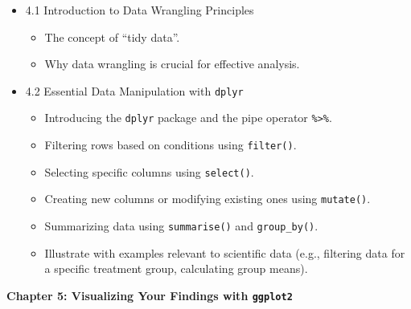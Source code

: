 \documentclass[
  letterpaper,
  DIV=11,
  numbers=noendperiod]{scrreprt}
\providecommand{\tightlist}{%
  \setlength{\itemsep}{0pt}\setlength{\parskip}{0pt}}\usepackage{longtable,booktabs,array}
\begin{document}
\begin{itemize}
\tightlist
\item
  4.1 Introduction to Data Wrangling Principles

  \begin{itemize}
  \tightlist
  \item
    The concept of ``tidy data''.
  \item
    Why data wrangling is crucial for effective analysis.
  \end{itemize}
\item
  4.2 Essential Data Manipulation with \texttt{dplyr}

  \begin{itemize}
  \tightlist
  \item
    Introducing the \texttt{dplyr} package and the pipe operator
    \texttt{\%\textgreater{}\%}.
  \item
    Filtering rows based on conditions using \texttt{filter()}.
  \item
    Selecting specific columns using \texttt{select()}.
  \item
    Creating new columns or modifying existing ones using
    \texttt{mutate()}.
  \item
    Summarizing data using \texttt{summarise()} and
    \texttt{group\_by()}.
  \item
    Illustrate with examples relevant to scientific data (e.g.,
    filtering data for a specific treatment group, calculating group
    means).
  \end{itemize}
\end{itemize}

\textbf{Chapter 5: Visualizing Your Findings with \texttt{ggplot2}}
\end{document}
